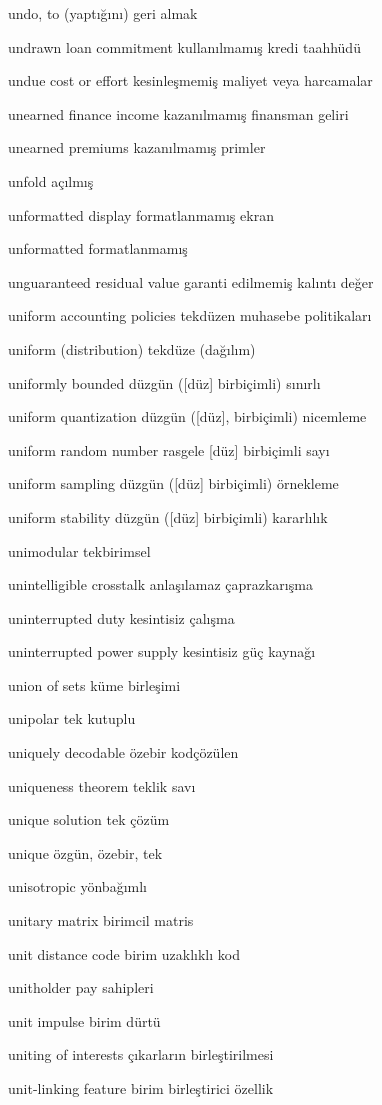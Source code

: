 \documentclass[12pt,fleqn]{article}\usepackage{../../common}
\begin{document}
undo, to (yaptığını) geri almak

undrawn loan commitment kullanılmamış kredi taahhüdü

undue cost or effort kesinleşmemiş maliyet veya harcamalar

unearned finance income kazanılmamış finansman geliri

unearned premiums kazanılmamış primler

unfold açılmış

unformatted display formatlanmamış ekran

unformatted formatlanmamış

unguaranteed residual value garanti edilmemiş kalıntı değer

uniform accounting policies tekdüzen muhasebe politikaları

uniform (distribution) tekdüze (dağılım)

uniformly bounded düzgün ([düz] birbiçimli) sınırlı

uniform quantization düzgün ([düz], birbiçimli) nicemleme 

uniform random number rasgele [düz] birbiçimli sayı

uniform sampling düzgün ([düz] birbiçimli) örnekleme

uniform stability düzgün ([düz] birbiçimli) kararlılık

unimodular tekbirimsel

unintelligible crosstalk anlaşılamaz çaprazkarışma

uninterrupted duty kesintisiz çalışma

uninterrupted power supply kesintisiz güç kaynağı

union of sets küme birleşimi

unipolar tek kutuplu

uniquely decodable özebir kodçözülen

uniqueness theorem teklik savı

unique solution tek çözüm

unique özgün, özebir, tek

unisotropic yönbağımlı

unitary matrix birimcil matris

unit distance code birim uzaklıklı kod

unitholder pay sahipleri

unit impulse birim dürtü

uniting of interests çıkarların birleştirilmesi

unit-linking feature birim birleştirici özellik
\end{document}
